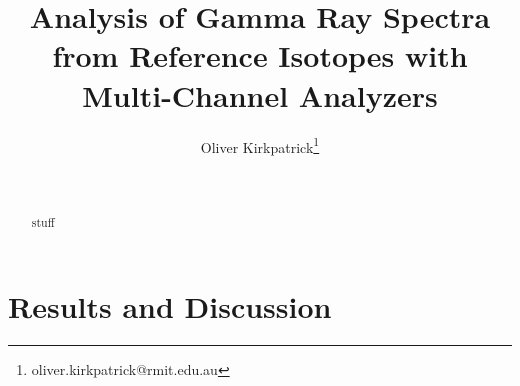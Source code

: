 \documentclass[a4paper,twocolumn]{IEEEtran}
\author{Oliver Kirkpatrick\footnote{oliver.kirkpatrick@rmit.edu.au}}
\begin{document}
    \title{Analysis of Gamma Ray Spectra from Reference Isotopes with Multi-Channel Analyzers}
    \author{
    \\
    }

    \maketitle
    \begin{abstract}
        stuff
    \end{abstract}
    \section{Results and Discussion}
\end{document}
